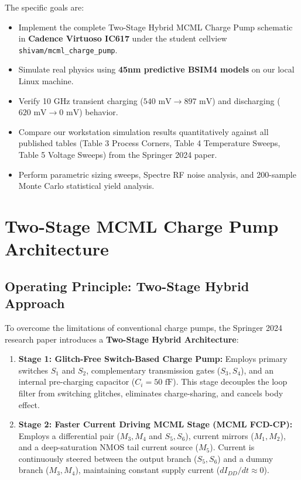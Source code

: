 \documentclass[11pt,a4paper]{report}
\begin{document}
The specific goals are:
\begin{itemize}
    \item Implement the complete Two-Stage Hybrid MCML Charge Pump schematic in \textbf{Cadence Virtuoso IC617} under the student cellview \texttt{shivam/mcml\_charge\_pump}.
    \item Simulate real physics using \textbf{45nm predictive BSIM4 models} on our local Linux machine.
    \item Verify 10 GHz transient charging ($540\text{ mV} \to 897\text{ mV}$) and discharging ($620\text{ mV} \to 0\text{ mV}$) behavior.
    \item Compare our workstation simulation results quantitatively against all published tables (Table 3 Process Corners, Table 4 Temperature Sweeps, Table 5 Voltage Sweeps) from the Springer 2024 paper.
    \item Perform parametric sizing sweeps, Spectre RF noise analysis, and 200-sample Monte Carlo statistical yield analysis.
\end{itemize}

\newpage

\chapter{Two-Stage MCML Charge Pump Architecture}

\section{Operating Principle: Two-Stage Hybrid Approach}
To overcome the limitations of conventional charge pumps, the Springer 2024 research paper introduces a \textbf{Two-Stage Hybrid Architecture}:
\begin{enumerate}
    \item \textbf{Stage 1: Glitch-Free Switch-Based Charge Pump:} Employs primary switches $S_1$ and $S_2$, complementary transmission gates ($S_3, S_4$), and an internal pre-charging capacitor ($C_i = 50\text{ fF}$). This stage decouples the loop filter from switching glitches, eliminates charge-sharing, and cancels body effect.
    \item \textbf{Stage 2: Faster Current Driving MCML Stage (MCML FCD-CP):} Employs a differential pair ($M_3, M_4$ and $S_5, S_6$), current mirrors ($M_1, M_2$), and a deep-saturation NMOS tail current source ($M_5$). Current is continuously steered between the output branch ($S_5, S_6$) and a dummy branch ($M_3, M_4$), maintaining constant supply current ($dI_{DD}/dt \approx 0$).
\end{enumerate}
\end{document}
